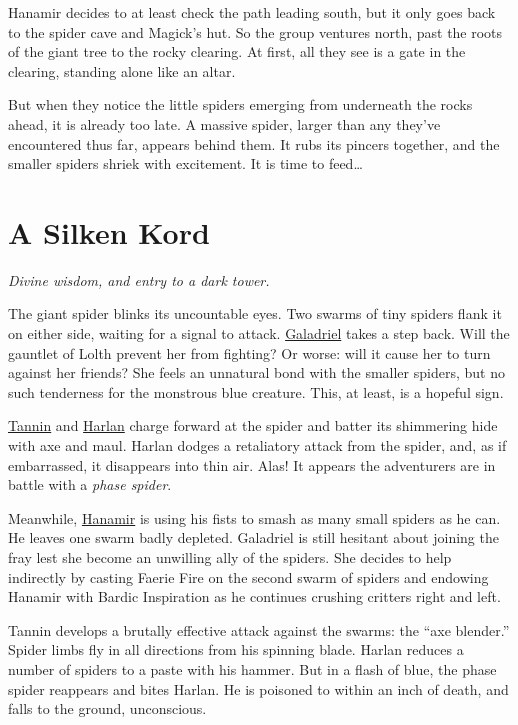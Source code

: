 \documentclass[smalldemyvopaper,11pt,twoside,onecolumn,openright,extrafontsizes]{memoir}
\newcommand{\chapdesc}[1]{
    \begin{flushright}
    \emph{{#1}}
    \end{flushright}
    \vspace{26pt}
}
\begin{document}
Hanamir decides to at least check the path leading south, but it only
goes back to the spider cave and Magick's hut. So the group ventures
north, past the roots of the giant tree to the rocky clearing. At first,
all they see is a gate in the clearing, standing alone like an altar.

But when they notice the little spiders emerging from underneath the
rocks ahead, it is already too late. A massive spider, larger than any
they've encountered thus far, appears behind them. It rubs its pincers
together, and the smaller spiders shriek with excitement. It is time to
feed\ldots{}


\chapter{A Silken Kord}
\chapdesc{Divine wisdom, and entry to a dark tower.}

The giant spider blinks its uncountable eyes. Two swarms of tiny spiders
flank it on either side, waiting for a signal to attack.
\href{/characters/galadriel/}{Galadriel} takes a step back. Will the
gauntlet of Lolth prevent her from fighting? Or worse: will it cause her
to turn against her friends? She feels an unnatural bond with the
smaller spiders, but no such tenderness for the monstrous blue creature.
This, at least, is a hopeful sign.

\href{/characters/tannin/}{Tannin} and
\href{/characters/harlan/}{Harlan} charge forward at the spider and
batter its shimmering hide with axe and maul. Harlan dodges a
retaliatory attack from the spider, and, as if embarrassed, it
disappears into thin air. Alas! It appears the adventurers are in battle
with a \emph{phase spider}.

Meanwhile, \href{/characters/hanamir/}{Hanamir} is using his fists to
smash as many small spiders as he can. He leaves one swarm badly
depleted. Galadriel is still hesitant about joining the fray lest she
become an unwilling ally of the spiders. She decides to help indirectly
by casting Faerie Fire on the second swarm of spiders and endowing
Hanamir with Bardic Inspiration as he continues crushing critters right
and left.

Tannin develops a brutally effective attack against the swarms: the
``axe blender.'' Spider limbs fly in all directions from his spinning
blade. Harlan reduces a number of spiders to a paste with his hammer.
But in a flash of blue, the phase spider reappears and bites Harlan. He
is poisoned to within an inch of death, and falls to the ground,
unconscious.
\end{document}
